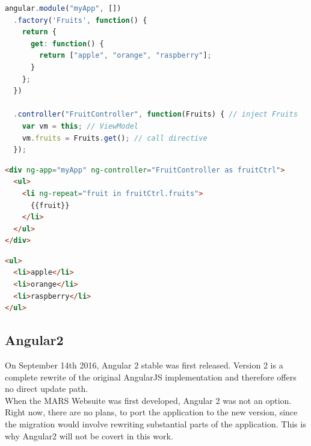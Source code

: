 \begin{lstlisting}[language=javascript, caption=AngularJS directive and controller definition, label=lst:angular]
angular.module("myApp", [])
  .factory('Fruits', function() {
    return {
      get: function() {
        return ["apple", "orange", "raspberry"];
      }
    };
  })
  
  .controller("FruitController", function(Fruits) { // inject Fruits
    var vm = this; // ViewModel
    vm.fruits = Fruits.get(); // call directive
  });
\end{lstlisting}

\begin{lstlisting}[language=html, caption=AngularJS template]
<div ng-app="myApp" ng-controller="FruitController as fruitCtrl">
  <ul>
    <li ng-repeat="fruit in fruitCtrl.fruits">
      {{fruit}}
    </li>
  </ul>
</div>
\end{lstlisting}

\begin{lstlisting}[language=html, caption=HTML result]
<ul>
  <li>apple</li>
  <li>orange</li>
  <li>raspberry</li>
</ul>
\end{lstlisting}


\subsection{Angular2}
On September 14th 2016, Angular 2 stable was first released. Version 2 is a complete rewrite of the original AngularJS implementation and therefore offers no direct update path.\\
When the MARS Websuite was first developed, Angular 2 was not an option. Right now, there are no plans, to port the application to the new version, since the migration would involve rewriting substantial parts of the application. This is why Angular2 will not be covert in this work.

